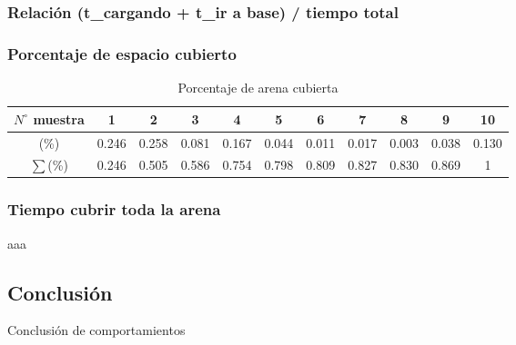 \subsubsection{Relaci\'on (t\_cargando + t\_ir a base) / tiempo total}

\subsubsection{Porcentaje de espacio cubierto}
\begin{table}
	\begin{center}
		\begin{tabular}{|c||c|c|c|c|c|c|c|c|c|c|}
		\hline
			$N^\circ$ muestra & 1 & 2 & 3 & 4 & 5 & 6 & 7 & 8 & 9 & 10 \\
		\hline
			(\%) & 0.246 &  0.258 &  0.081 &  0.167 &  0.044 &  0.011 &  0.017 &  0.003 &  0.038 &  0.130 \\
		\hline
			$\sum$(\%) & 0.246 &  0.505 &  0.586 &  0.754 &  0.798 &  0.809 &  0.827 &  0.830 &  0.869 &  1 \\
		\hline
		\end{tabular}
	\end{center}
	\caption{Porcentaje de arena cubierta}
	\label{arena:covered}
\end{table}

\subsubsection{Tiempo cubrir toda la arena}
aaa

\newpage
\subsection{Conclusi\'on}
\label{comp_conclusion}
Conclusi\'on de comportamientos

